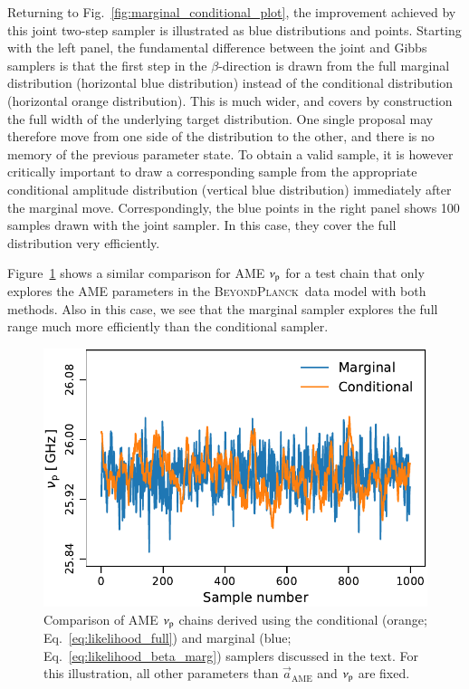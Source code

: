 \documentclass[twocolumn]{aa}
\renewcommand{\a}[0]{\vec{a}}
\newcommand{\BP}{\textsc{BeyondPlanck}}
\begin{document}
Returning to Fig.~\ref{fig:marginal_conditional_plot}, the improvement
achieved by this joint two-step sampler is illustrated as blue
distributions and points. Starting with the left panel, the
fundamental difference between the joint and Gibbs samplers is that
the first step in the $\beta$-direction is drawn from the full
marginal distribution (horizontal blue distribution) instead of the
conditional distribution (horizontal orange distribution). This is
much wider, and covers by construction the full width of the
underlying target distribution. One single proposal may therefore move
from one side of the distribution to the other, and there is no memory
of the previous parameter state. To obtain a valid sample, it is
however critically important to draw a corresponding sample from the
appropriate conditional amplitude distribution (vertical blue
distribution) immediately after the marginal move. Correspondingly,
the blue points in the right panel shows 100 samples drawn with the
joint sampler. In this case, they cover the full distribution very
efficiently.

Figure~\ref{fig:combined_sampler_chains} shows a similar comparison
for AME $\nup$ for a test chain that only explores the AME parameters
in the \BP\ data model with both methods. Also in this case, we see that the marginal
sampler explores the full range much more efficiently than the
conditional sampler. 

\begin{figure}[t]
  \center
  \includegraphics[width=\linewidth]{figs/ame_nu_p_adj_smin3_smax1000_cmin8_nc2.pdf}
  \caption{Comparison of AME $\nup$ chains derived using the conditional (orange; Eq.~\ref{eq:likelihood_full}) and marginal (blue; Eq.~\ref{eq:likelihood_beta_marg}) samplers discussed in the text. For this illustration, all other parameters than $\a_{\mathrm{AME}}$ and $\nup$ are fixed.}
  \label{fig:combined_sampler_chains}
\end{figure}
\end{document}
